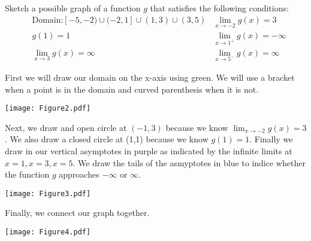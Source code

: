 \documentclass[nooutcomes]{ximera}
\begin{document}
\begin{problem}
	Sketch a possible graph of a function $g$ that satisfies the following conditions:
	\begin{align*}
	&\text{Domain:} [-5,-2) \cup (-2,1] \cup (1,3) \cup (3,5)
	& \lim_{x \to -2} g(x) = 3\\
	& g(1)=1
	& \lim_{x \to 1^+} g(x) = -\infty\\
	& \lim_{x \to 3} g(x) = \infty
	& \lim_{x \to 5^-} g(x) = \infty
	\end{align*}
	\begin{freeResponse}
	First we will draw our domain on the x-axis using green.  We will use a bracket when a point is in the domain and curved parenthesis when it is not.
  \begin{center}
    \texttt{[image: Figure2.pdf]}
  \end{center}
	Next, we draw and open circle at $(-1,3)$ because we know $\lim_{x \to -2} g(x) = 3$.  We also draw a closed circle at (1,1) because we know $g(1)=1$.  Finally we draw in our vertical asymptotes in purple as indicated by the infinite limits at $x=1, x=3, x=5$.  We draw the tails of the asmyptotes in blue to indice whether the function $g$ approaches $ -\infty$ or $\infty$.
  \begin{center}
    \texttt{[image: Figure3.pdf]}
  \end{center}
	Finally, we connect our graph together.
  \begin{center}
    \texttt{[image: Figure4.pdf]}
  \end{center}
	\end{freeResponse}
\end{problem}
\end{document}

